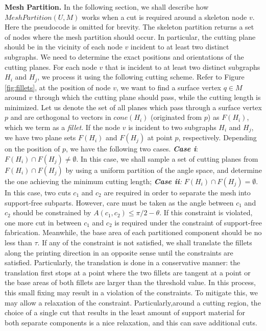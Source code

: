 {\textbf{Mesh Partition.}
{{In the following section, we shall describe how $MeshPartition(U , M)$ works when a cut is required around a skeleton node $v$. Here the pseudocode is omitted for brevity.}}
The skeleton partition returns a set of nodes where the mesh partition should occur. In particular, the cutting plane should be in the vicinity of each node $v$ incident to at least two distinct subgraphs. We need to determine the exact positions and orientations of the cutting planes. For each node $v$ that is incident to at least two distinct subgraphs $H_i$ and $H_j$, we process it using the following cutting scheme.
Refer to Figure \ref{fig:fillets}, at the position of node $v$, we want to find a surface vertex $q \in M$ around $v$ through which the cutting plane should pass, while the cutting length is minimized. Let us denote the set of all planes which pass through a surface vertex $p$ and are orthogonal to vectors in $cone(H_i)$ (originated from $p$)  as $F(H_i)$, which we term as a \emph{fillet}. If the node $v$ is incident to two subgraphs $H_i$ and $H_j$, we have two plane sets $F(H_i)$ and $F(H_j)$ at point $p$, respectively. Depending on the position of $p$, we have the following two cases. \emph{\textbf{Case i}}: $F(H_i) \cap F(H_j) \neq \emptyset$. In this case, we shall sample a set of cutting planes from $F(H_i) \cap F(H_j)$ by using a uniform partition of the angle space, and determine the one achieving the minimum cutting length; \emph{\textbf{Case ii}:} $F(H_i) \cap F(H_j) = \emptyset$. In this case, two cuts $c_1$ and $c_2$ are required in order to separate the mesh into support-free subparts. However, care must be taken as the angle between $c_1$ and $c_2$ should be constrained by $A(c_1, c_2) \leq \pi/2-\theta$. If this constraint is violated, one more cut in between $c_1$ and $c_2$ is required under the constraint of support-free fabrication. Meanwhile, the base area of each partitioned component should be no less than $\tau$. If any of the constraint is not satisfied, we shall translate the fillets along the printing direction in an opposite sense until the constraints are satisfied. Particularly, the translation is done in a conservative manner: the translation first stops at a point where the two fillets are tangent at a point or the base areas of both fillets are larger than the threshold value. In this process, this small fixing may result in a violation of the constraints. To mitigate this, we may allow a relaxation of the constraint. Particularly,around a cutting region, the choice of a single cut that results in the least amount of support material for both separate components is a nice relaxation, and this can save additional cuts.

}
